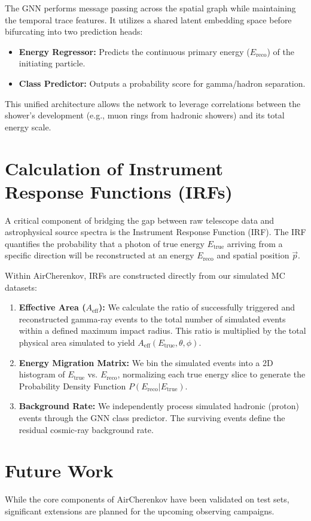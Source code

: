 \documentclass[twocolumn,times]{aastex631}
\begin{document}
The GNN performs message passing across the spatial graph while maintaining the temporal trace features. It utilizes a shared latent embedding space before bifurcating into two prediction heads:
\begin{itemize}
    \item \textbf{Energy Regressor:} Predicts the continuous primary energy ($E_{\mathrm{reco}}$) of the initiating particle.
    \item \textbf{Class Predictor:} Outputs a probability score for gamma/hadron separation.
\end{itemize}
This unified architecture allows the network to leverage correlations between the shower's development (e.g., muon rings from hadronic showers) and its total energy scale.

\section{Calculation of Instrument Response Functions (IRFs)}
A critical component of bridging the gap between raw telescope data and astrophysical source spectra is the Instrument Response Function (IRF). The IRF quantifies the probability that a photon of true energy $E_{\mathrm{true}}$ arriving from a specific direction will be reconstructed at an energy $E_{\mathrm{reco}}$ and spatial position $\vec{p}$. 

Within AirCherenkov, IRFs are constructed directly from our simulated MC datasets:
\begin{enumerate}
    \item \textbf{Effective Area ($A_{\mathrm{eff}}$):} We calculate the ratio of successfully triggered and reconstructed gamma-ray events to the total number of simulated events within a defined maximum impact radius. This ratio is multiplied by the total physical area simulated to yield $A_{\mathrm{eff}}(E_{\mathrm{true}}, \theta, \phi)$.
    \item \textbf{Energy Migration Matrix:} We bin the simulated events into a 2D histogram of $E_{\mathrm{true}}$ vs. $E_{\mathrm{reco}}$, normalizing each true energy slice to generate the Probability Density Function $P(E_{\mathrm{reco}} | E_{\mathrm{true}})$.
    \item \textbf{Background Rate:} We independently process simulated hadronic (proton) events through the GNN class predictor. The surviving events define the residual cosmic-ray background rate.
\end{enumerate}

\section{Future Work}
While the core components of AirCherenkov have been validated on test sets, significant extensions are planned for the upcoming observing campaigns.
\end{document}
